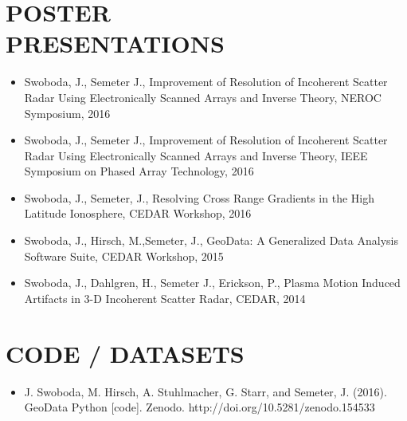 \section*{POSTER \\ PRESENTATIONS}
\begin{itemize}
\item Swoboda, J., Semeter J., Improvement of Resolution of Incoherent Scatter Radar Using Electronically Scanned Arrays and Inverse Theory, NEROC Symposium, 2016
\item Swoboda, J., Semeter J., Improvement of Resolution of Incoherent Scatter Radar Using Electronically Scanned Arrays and Inverse Theory, IEEE Symposium on Phased Array Technology, 2016
\item Swoboda, J.,  Semeter, J., Resolving Cross Range Gradients in the High Latitude Ionosphere, CEDAR Workshop, 2016
\item Swoboda, J., Hirsch, M.,Semeter, J., GeoData: A Generalized Data Analysis Software Suite, CEDAR Workshop, 2015
\item Swoboda, J., Dahlgren, H., Semeter J., Erickson, P., Plasma Motion Induced Artifacts in 3-D Incoherent Scatter Radar, CEDAR, 2014
\end{itemize}

\section*{CODE / DATASETS}
\begin{itemize}
\item J. Swoboda, M. Hirsch, A. Stuhlmacher, G. Starr, and Semeter, J. (2016). GeoData Python [code]. Zenodo. http://doi.org/10.5281/zenodo.154533
\end{itemize}
